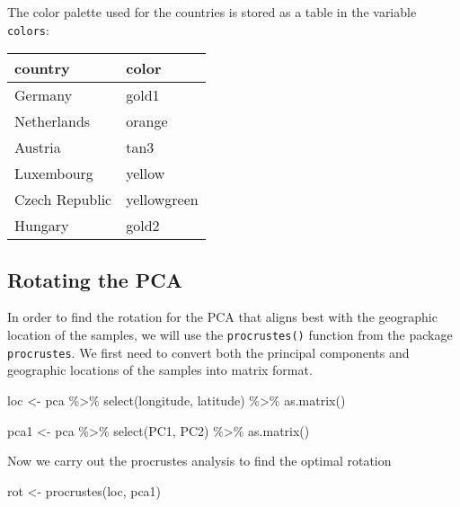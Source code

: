 \documentclass[
]{article}
\newenvironment{Shaded}{\begin{snugshade}}{\end{snugshade}}
\newcommand{\FunctionTok}[1]{\textcolor[rgb]{0.00,0.00,0.00}{#1}}
\newcommand{\NormalTok}[1]{#1}
\newcommand{\OtherTok}[1]{\textcolor[rgb]{0.56,0.35,0.01}{#1}}
\newcommand{\SpecialCharTok}[1]{\textcolor[rgb]{0.00,0.00,0.00}{#1}}
\begin{document}
The color palette used for the countries is stored as a table in the
variable \texttt{colors}:

\begin{longtable}[]{@{}ll@{}}
\toprule
country & color \\
\midrule
\endhead
Germany & gold1 \\
Netherlands & orange \\
Austria & tan3 \\
Luxembourg & yellow \\
Czech Republic & yellowgreen \\
Hungary & gold2 \\
\bottomrule
\end{longtable}

\hypertarget{rotating-the-pca}{%
\subsection{Rotating the PCA}\label{rotating-the-pca}}

In order to find the rotation for the PCA that aligns best with the
geographic location of the samples, we will use the
\texttt{procrustes()} function from the package \texttt{procrustes}. We
first need to convert both the principal components and geographic
locations of the samples into matrix format.

\begin{Shaded}
\begin{Highlighting}[]
\NormalTok{loc }\OtherTok{\textless{}{-}}\NormalTok{ pca }\SpecialCharTok{\%\textgreater{}\%}
    \FunctionTok{select}\NormalTok{(longitude, latitude) }\SpecialCharTok{\%\textgreater{}\%}
    \FunctionTok{as.matrix}\NormalTok{()}

\NormalTok{pca1 }\OtherTok{\textless{}{-}}\NormalTok{ pca }\SpecialCharTok{\%\textgreater{}\%}
    \FunctionTok{select}\NormalTok{(PC1, PC2) }\SpecialCharTok{\%\textgreater{}\%}
    \FunctionTok{as.matrix}\NormalTok{()}
\end{Highlighting}
\end{Shaded}

Now we carry out the procrustes analysis to find the optimal rotation

\begin{Shaded}
\begin{Highlighting}[]
\NormalTok{rot }\OtherTok{\textless{}{-}} \FunctionTok{procrustes}\NormalTok{(loc, pca1)}
\end{Highlighting}
\end{Shaded}
\end{document}
